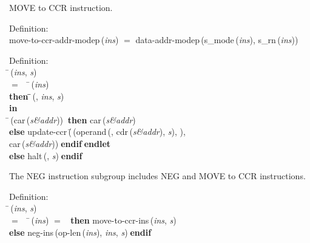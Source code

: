  MOVE to CCR instruction.
\begin{tabbing}{\sc Definition}: \\  
{\rm{move-to-ccr-addr-modep}}\,({\it{ins\/}}) $=$ {\rm{data-addr-modep}}\,({\rm{s\_mode}}\,({\it{ins\/}}), {\rm{s\_rn}}\,({\it{ins\/}}))
\end{tabbing}

\begin{tabbing}{\sc Definition}: \\  
\=\,({\it{ins\/}}, {\it{s\/}}) \\ 
$=$$\;\;\;\;$\=\,({\it{ins\/}}) \\ 
{\bf then }\=\=\,({}, {\it{ins\/}}, {\it{s\/}})\- \\ 
{\bf in} \\ 
\=\,({\rm{car}}\,({\it{s\&addr\/}}))$\;\;${\bf then }{\rm{car}}\,({\it{s\&addr\/}}) \\ 
{\bf else }{\rm{update-ccr}}\,(\=\,({\rm{operand}}\,({}, {\rm{cdr}}\,({\it{s\&addr\/}}), {\it{s\/}}), {}), \\ 
{\rm{car}}\,({\it{s\&addr\/}}))\-$\;${\bf  endif}\-$\;${\bf  endlet}\- \\ 
{\bf else }{\rm{halt}}\,({}, {\it{s\/}})$\;${\bf  endif}\-\-
\end{tabbing}

 The NEG instruction subgroup includes NEG and MOVE to CCR instructions.
\begin{tabbing}{\sc Definition}: \\  
\=\,({\it{ins\/}}, {\it{s\/}}) \\ 
$=$$\;\;\;\;$\=\,({\it{ins\/}}) $=$ {}$\;\;${\bf then }{\rm{move-to-ccr-ins}}\,({\it{ins\/}}, {\it{s\/}}) \\ 
{\bf else }{\rm{neg-ins}}\,({\rm{op-len}}\,({\it{ins\/}}), {\it{ins\/}}, {\it{s\/}})$\;${\bf  endif}\-\-
\end{tabbing}

